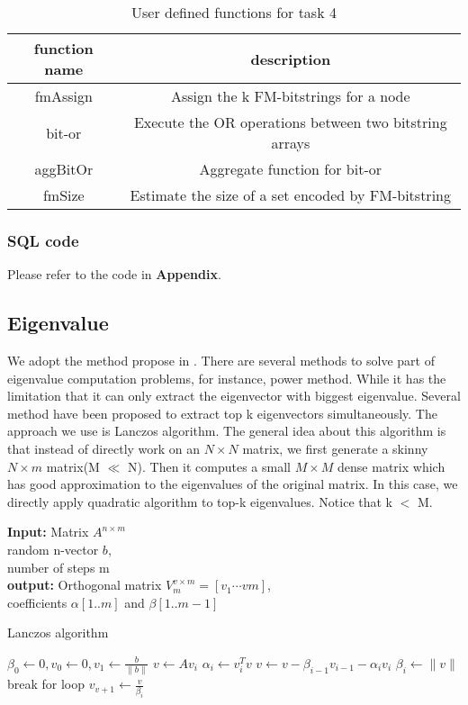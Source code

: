 \begin{table}[[!htbf]
\caption{User defined functions for task 4}
\begin{center}
\begin{tabular}{|c|c|}
\hline \hline
function name & description \\
\hline
fmAssign & Assign the k FM-bitstrings for a node \\
bit-or & Execute the OR operations between two bitstring arrays \\
aggBitOr & Aggregate function for bit-or \\
fmSize & Estimate the size of a set encoded by FM-bitstring \\
\hline

\end{tabular}
\end{center}
\label{table:radius}
\end{table}%


\subsubsection{SQL code}
Please refer to the code in {\bf Appendix}.

\subsection{Eigenvalue}
We adopt the method propose in \cite{kang2011spectral}. There are several methods to solve part of eigenvalue computation problems, for instance, power method\cite{langville2004deeper}. While it has the limitation that it can only extract the eigenvector with biggest eigenvalue. Several method have been proposed to extract top k eigenvectors simultaneously. The approach we use is Lanczos algorithm\cite{lanczos1950iteration}. The general idea about this algorithm is that instead of directly work on an $N \times N$ matrix, we first generate a skinny $N \times m$ matrix(M $\ll$ N). Then it computes a small $M \times M$ dense matrix which has good approximation to the eigenvalues of the original matrix. In this case, we directly apply quadratic algorithm to top-k eigenvalues. Notice that k $<$ M.

\begin{algorithm}
{\bf Input:} Matrix $A^{n \times m}$\\
random n-vector $b$,\\
number of steps m\\
{\bf output:} Orthogonal matrix $ V^{v \times m}_{m} = [v_{1}\cdots v{m}]$,\\
coefficients $\alpha[1..m]$ and $\beta[1..m-1]$
\begin{algorithmic}[1]
\caption{Lanczos algorithm}
\STATE $\beta_{0} \leftarrow 0, v_{0} \leftarrow 0, v_{1} \leftarrow \frac{b}{\parallel b \parallel}$ 
	\STATE $v \leftarrow Av_{i}$
	\STATE $\alpha_{i} \leftarrow v^{T}_{i}v $
	\STATE $v \leftarrow v - \beta_{i-1}v_{i-1} - \alpha_{i}v_{i}$
	\STATE $\beta_{i} \leftarrow \parallel v\parallel $
	\STATE break for loop 
	\ENDIF
	\STATE $ v_{v+1} \leftarrow \frac{v}{\beta_{i}} $
\ENDFOR
\end{algorithmic}
\label{eigen:algo1}
\end{algorithm}

